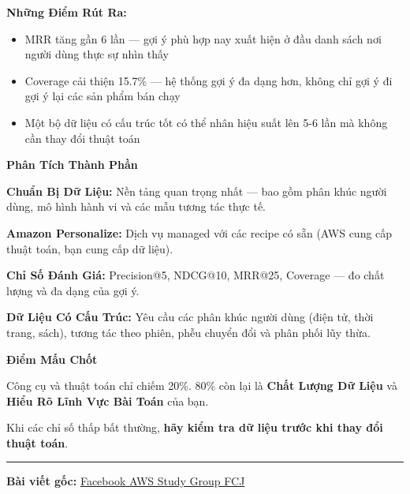 \vspace{0.5em}\noindent\textbf{Những Điểm Rút
Ra:}\par

\begin{itemize}
\tightlist
\item
  MRR tăng gần 6 lần --- gợi ý phù hợp nay xuất hiện ở đầu danh sách nơi
  người dùng thực sự nhìn thấy
\item
  Coverage cải thiện 15.7\% --- hệ thống gợi ý đa dạng hơn, không chỉ
  gợi ý đi gợi ý lại các sản phẩm bán chạy
\item
  Một bộ dữ liệu có cấu trúc tốt có thể nhân hiệu suất lên 5-6 lần mà
  không cần thay đổi thuật toán
\end{itemize}

\vspace{0.5em}\noindent\textbf{Phân Tích Thành
Phần}\par

\textbf{Chuẩn Bị Dữ Liệu:} Nền tảng quan trọng nhất --- bao gồm phân
khúc người dùng, mô hình hành vi và các mẫu tương tác thực tế.

\textbf{Amazon Personalize:} Dịch vụ managed với các recipe có sẵn (AWS
cung cấp thuật toán, bạn cung cấp dữ liệu).

\textbf{Chỉ Số Đánh Giá:} Precision@5, NDCG@10, MRR@25, Coverage --- đo
chất lượng và đa dạng của gợi ý.

\textbf{Dữ Liệu Có Cấu Trúc:} Yêu cầu các phân khúc người dùng (điện tử,
thời trang, sách), tương tác theo phiên, phễu chuyển đổi và phân phối
lũy thừa.

\vspace{0.5em}\noindent\textbf{Điểm Mấu Chốt}\par

Công cụ và thuật toán chỉ chiếm 20\%. 80\% còn lại là \textbf{Chất Lượng
Dữ Liệu} và \textbf{Hiểu Rõ Lĩnh Vực Bài Toán} của bạn.

Khi các chỉ số thấp bất thường, \textbf{hãy kiểm tra dữ liệu trước khi
thay đổi thuật toán}.

\begin{center}\rule{0.5\linewidth}{0.5pt}\end{center}

\textbf{Bài viết gốc:}
\href{https://www.facebook.com/groups/awsstudygroupfcj/permalink/2229279517837008/?rdid=7zgI0zX0X33fQod5\#}{Facebook
AWS Study Group FCJ}

